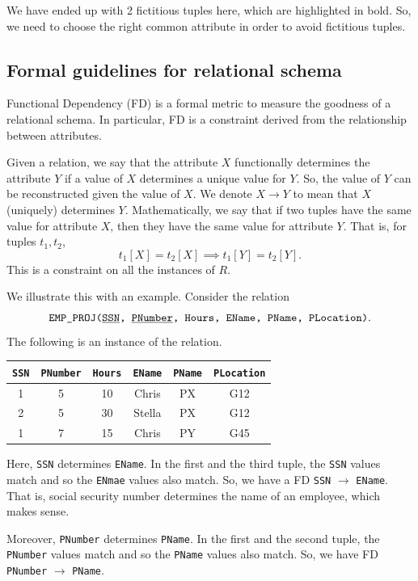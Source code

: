 \documentclass[a4paper, openany]{memoir}
\begin{document}
\noindent We have ended up with 2 fictitious tuples here, which are highlighted in bold. So, we need to choose the right common attribute in order to avoid fictitious tuples.

\subsection{Formal guidelines for relational schema}
Functional Dependency (FD) is a formal metric to measure the goodness of a relational schema. In particular, FD is a constraint derived from the relationship between attributes. 

Given a relation, we say that the attribute $X$ functionally determines the attribute $Y$ if a value of $X$ determines a unique value for $Y$. So, the value of $Y$ can be reconstructed given the value of $X$. We denote $X \to Y$ to mean that $X$ (uniquely) determines $Y$. Mathematically, we say that if two tuples have the same value for attribute $X$, then they have the same value for attribute $Y$. That is, for tuples $t_1, t_2$,
\[t_1[X] = t_2[X] \implies t_1[Y] = t_2[Y].\]
This is a constraint on all the instances of $R$.

We illustrate this with an example. Consider the relation
\[\texttt{EMP\_PROJ(\underline{SSN}, \underline{PNumber}, Hours, EName, PName, PLocation)}.\]
The following is an instance of the relation.
\begin{table}[H]
    \centering
    \begin{tabular}{|c|c|c|c|c|c|}
        \hline
        \texttt{SSN} & \texttt{PNumber} & \texttt{Hours} & \texttt{EName} & \texttt{PName} & \texttt{PLocation} \\
        \hline
        1 & 5 & 10 & Chris & PX & G12 \\
        2 & 5 & 30 & Stella & PX & G12 \\
        1 & 7 & 15 & Chris & PY & G45 \\
        \hline
    \end{tabular}
\end{table}
\noindent Here, \texttt{SSN} determines \texttt{EName}. In the first and the third tuple, the \texttt{SSN} values match and so the \texttt{ENmae} values also match. So, we have a FD \texttt{SSN} $\to$ \texttt{EName}. That is, social security number determines the name of an employee, which makes sense.

Moreover, \texttt{PNumber} determines \texttt{PName}. In the first and the second tuple, the \texttt{PNumber} values match and so the \texttt{PName} values also match. So, we have FD \texttt{PNumber} $\to$ \texttt{PName}.
\end{document}
